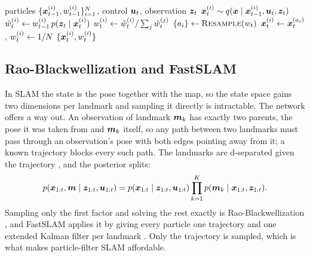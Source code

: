 \begin{algorithm}[!ht]
\caption{One step of the particle filter. Lines 5 and 6 are what this report varies.}\label{alg:pf}
\begin{algorithmic}[1]
\Require particles $\{\bm{x}_{t-1}^{(i)}, w_{t-1}^{(i)}\}_{i=1}^{N}$, control $\bm{u}_t$, observation $\bm{z}_t$
  \State $\bm{x}_t^{(i)} \sim q(\bm{x} \mid \bm{x}_{t-1}^{(i)}, \bm{u}_t, \bm{z}_t)$
  \State $\tilde{w}_t^{(i)} \gets w_{t-1}^{(i)}\, p(\bm{z}_t \mid \bm{x}_t^{(i)})$
\EndFor
\State $w_t^{(i)} \gets \tilde{w}_t^{(i)} / \sum_j \tilde{w}_t^{(j)}$
                
  \State $\{a_i\} \gets \textsc{Resample}(w_t)$   
  \State $\bm{x}_t^{(i)} \gets \bm{x}_t^{(a_i)}$, \quad $w_t^{(i)} \gets 1/N$
\EndIf
\State \Return $\{\bm{x}_t^{(i)}, w_t^{(i)}\}$
\end{algorithmic}
\end{algorithm}

\subsection{Rao-Blackwellization and FastSLAM}\label{sec:rbpf}

In SLAM the state is the pose together with the map, so the state space gains two dimensions per landmark and
sampling it directly is intractable. The network offers a way out. An observation of landmark $\bm{m}_k$ has exactly
two parents, the pose it was taken from and $\bm{m}_k$ itself, so any path between two landmarks must pass through
an observation's pose with both edges pointing away from it; a known trajectory blocks every such path. The
landmarks are d-separated given the trajectory \cite{koller2009probabilistic}, and the posterior splits:
\begin{equation}
  p(\bm{x}_{1:t}, \bm{m} \mid \bm{z}_{1:t}, \bm{u}_{1:t}) = p(\bm{x}_{1:t} \mid \bm{z}_{1:t}, \bm{u}_{1:t})
  \prod_{k=1}^{K} p(\bm{m}_k \mid \bm{x}_{1:t}, \bm{z}_{1:t}).
  \label{eq:rao-blackwell}
\end{equation}
Sampling only the first factor and solving the rest exactly is Rao-Blackwellization \cite{doucet2000rao}, and
FastSLAM applies it by giving every particle one trajectory and one extended Kalman filter per landmark
\cite{montemerlo2002fastslam}. Only the trajectory is sampled, which is what makes particle-filter SLAM
affordable.

